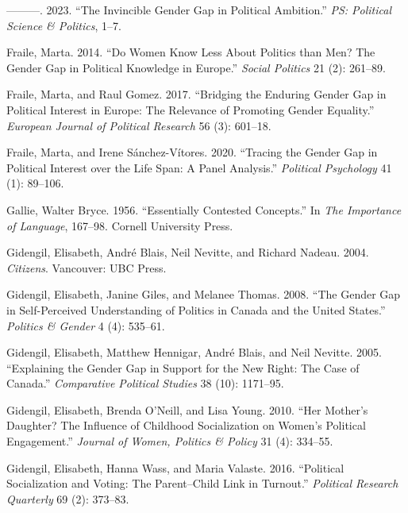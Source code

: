 \documentclass[
  letterpaper,
  DIV=11,
  numbers=noendperiod]{scrreprt}
\newlength{\cslhangindent}
\newlength{\cslentryspacingunit} %
\newenvironment{CSLReferences}[2] %
 {%
  \setlength{\parindent}{0pt}
  \ifodd #1
  \let\oldpar\par
  \def\par{\hangindent=\cslhangindent\oldpar}
  \fi
  \setlength{\parskip}{#2\cslentryspacingunit}
 }%
 {}
\begin{document}
\begin{CSLReferences}{1}{0}
\leavevmode{}%
---------. 2023. {``{The Invincible Gender Gap in Political
Ambition}.''} \emph{PS: Political Science \& Politics}, 1--7.

\leavevmode{}%
Fraile, Marta. 2014. {``{Do Women Know Less About Politics than Men? The
Gender Gap in Political Knowledge in Europe}.''} \emph{Social Politics}
21 (2): 261--89.

\leavevmode{}%
Fraile, Marta, and Raul Gomez. 2017. {``{Bridging the Enduring Gender
Gap in Political Interest in Europe: The Relevance of Promoting Gender
Equality}.''} \emph{European Journal of Political Research} 56 (3):
601--18.

\leavevmode{}%
Fraile, Marta, and Irene Sánchez-Vítores. 2020. {``{Tracing the Gender
Gap in Political Interest over the Life Span: A Panel Analysis}.''}
\emph{Political Psychology} 41 (1): 89--106.

\leavevmode{}%
Gallie, Walter Bryce. 1956. {``{Essentially Contested Concepts}.''} In
\emph{{The Importance of Language}}, 167--98. Cornell University Press.

\leavevmode{}%
Gidengil, Elisabeth, André Blais, Neil Nevitte, and Richard Nadeau.
2004. \emph{Citizens}. Vancouver: UBC Press.

\leavevmode{}%
Gidengil, Elisabeth, Janine Giles, and Melanee Thomas. 2008. {``{The
Gender Gap in Self-Perceived Understanding of Politics in Canada and the
United States}.''} \emph{Politics \& Gender} 4 (4): 535--61.

\leavevmode{}%
Gidengil, Elisabeth, Matthew Hennigar, André Blais, and Neil Nevitte.
2005. {``{Explaining the Gender Gap in Support for the New Right: The
Case of Canada}.''} \emph{Comparative Political Studies} 38 (10):
1171--95.

\leavevmode{}%
Gidengil, Elisabeth, Brenda O'Neill, and Lisa Young. 2010. {``{Her
Mother's Daughter? The Influence of Childhood Socialization on Women's
Political Engagement}.''} \emph{Journal of Women, Politics \& Policy} 31
(4): 334--55.

\leavevmode{}%
Gidengil, Elisabeth, Hanna Wass, and Maria Valaste. 2016. {``{Political
Socialization and Voting: The Parent--Child Link in Turnout}.''}
\emph{Political Research Quarterly} 69 (2): 373--83.


\end{CSLReferences}
\end{document}
